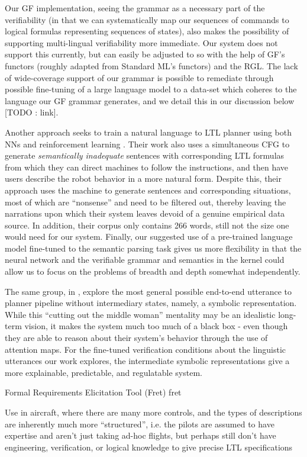 \documentclass{article}
\begin{document}
Our GF implementation, seeing the grammar as a necessary part of the
verifiability (in that we can systematically map our sequences of commands to
logical formulas representing sequences of states), also makes the possibility of
supporting multi-lingual verifiability more immediate. Our system does not
support this currently, but can easily be adjusted to so with the help of GF's
functors (roughly adapted from Standard ML's functors) and the RGL. The lack of wide-coverage
support of our grammar is possible to remediate through possible fine-tuning of
a large language model to a data-set which coheres to the language our GF
grammar generates, and we detail this in our discussion below [TODO : link].

Another approach seeks to train a natural language to LTL planner using both NNs
and reinforcement learning \cite{ltlSemParse}. Their work also uses a
simultaneous CFG to generate \emph{semantically inadequate} sentences with
corresponding LTL formulas from which they can direct machines to follow the
instructions, and then have users describe the robot behavior in a more natural
form. Despite this, their approach uses the machine to generate sentences and
corresponding situations, most of which are ``nonsense'' and need to be filtered
out, thereby leaving the narrations upon which their system leaves devoid of a
genuine empirical data source. In addition, their corpus only contains 266
words, still not the size one would need for our system. Finally, our suggested
use of a pre-trained language model fine-tuned to the semantic parsing task
gives us more flexibility in that the neural network and the verifiable grammar
and semantics in the kernel could allow us to focus on the problems of breadth
and depth somewhat independently.

The same group, in \cite{kuo2020deep}, explore the most general possible
end-to-end utterance to planner pipeline without intermediary states, namely, a
symbolic representation. While this ``cutting out the middle woman'' mentality
may be an idealistic long-term vision, it makes the system much too much of a
black box - even though they are able to reason about their system's behavior
through the use of attention maps. For the fine-tuned verification conditions
about the linguistic utterances our work explores, the intermediate symbolic
representations give a more explainable, predictable, and regulatable system.


Formal Requirements Elicitation Tool (Fret) {fret}

Use in aircraft, where there are many more controls, and the types of
descriptions are inherently much more ``structured'', i.e. the pilots are
assumed to have expertise and aren't just taking ad-hoc flights, but perhaps
still don't have engineering, verification, or logical knowledge to give precise
LTL specifications
\end{document}
